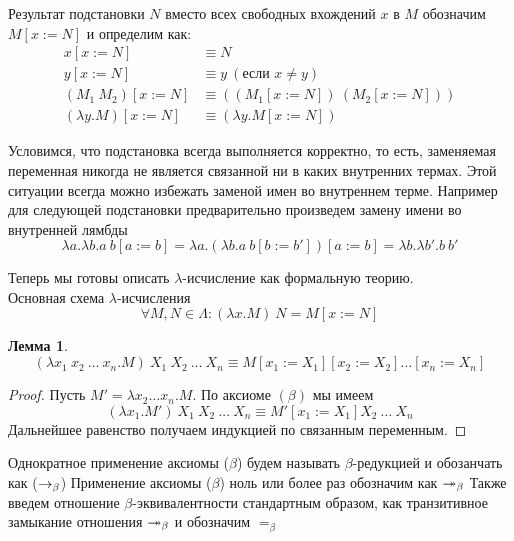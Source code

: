 \documentclass[lambda.tex]{subfiles}
\begin{document}
Результат подстановки $N$ вместо всех свободных вхождений $x$ в $M$ обозначим $M[x := N]$ и определим как:
\begin{align*}
x[x := N] &\equiv N\\
y[x := N] &\equiv y\ (\text{если } x \neq y)\\
(M_1 \ M_2 )[x := N] &\equiv ((M_1 [x := N])\ (M_2 [x := N]))\\
(\lambda y.M)[x := N] &\equiv (\lambda y.M[x := N])
\end{align*}

\begin{tcolorbox}

Условимся, что подстановка всегда выполняется корректно, то есть, заменяемая переменная никогда не является связанной ни в каких внутренних термах. Этой ситуации всегда можно избежать заменой имен во внутреннем терме. Например для следующей подстановки предварительно произведем замену имени во внутренней лямбды
\[\lambda a.\lambda b.a\ b[a := b] = \lambda a.(\lambda b.a\ b[b := b'])[a := b] = \lambda b.\lambda b'.b\ b'\]


\end{tcolorbox}

Теперь мы готовы описать $\lambda$-исчисление как формальную теорию.\\

Основная схема $\lambda$-исчисления
\begin{equation*}
\forall M, N \in \Lambda : (\lambda x.M)\ N = M[x := N]\tag{$\beta$}
\end{equation*}

\newtheorem{lemma}{Лемма}
\begin{lemma}
\[(\lambda x_1 \ x_2 \ \dots\ x_n .M)\ X_1 \ X_2 \ \dots\ X_n \equiv M[x_1 := X_1 ][x_2 := X_2]\dots[x_n := X_n ]\]
\end{lemma}
\begin{proof}
Пусть $M' = \lambda x_2 \dots x_n .M$. По аксиоме $(\beta)$ мы имеем
\[(\lambda x_1 .M')\ X_1 \ X_2 \ \dots\ X_n \equiv M'[x_1 := X_1 ] X_2 \ \dots\ X_n\]
Дальнейшее равенство получаем индукцией по связанным переменным.
\end{proof}

\begin{tcolorbox}
Однократное применение аксиомы ($\beta$) будем называть $\beta$-редукцией и обозанчать как ($\rightarrow_\beta$)
Применение аксиомы ($\beta$) ноль или более раз обозначим как $\twoheadrightarrow_\beta$
Также введем отношение $\beta$-эквивалентности стандартным образом, как транзитивное замыкание отношения $\twoheadrightarrow_\beta$ и обозначим $=_\beta$
\end{tcolorbox}
\end{document}
